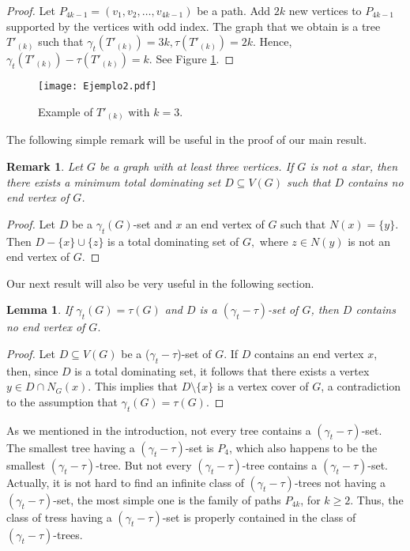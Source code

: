 \documentclass[12pt]{article}%
\newtheorem{lemma}[theorem]{Lemma}
\newtheorem{remark}[theorem]{Remark}
\theoremstyle{definition}
\newcommand{\gtt}{$(\gamma_t - \tau)$}
\begin{document}
\begin{proof} 
Let $P_{4k-1}=(v_1,v_2,\ldots,v_{4k-1})$ be a path. Add $2k$
new vertices to $P_{4k-1}$ supported by the vertices with odd
index. The graph that we obtain is a tree $T'_{(k)}$ such that
$\gamma_t(T'_{(k)})=3k, \tau(T'_{(k)})=2k$.   Hence, $\gamma_t
(T'_{(k)})-\tau(T'_{(k)})=k.$   See Figure \ref{fig2}.


\end{proof}

\begin{figure}[h]
\centering
  \texttt{[image: Ejemplo2.pdf]}
 \caption{Example of $T'_{(k)}$ with $k=3$.} \label{fig2}
\end{figure}

The following simple remark will be useful in the proof
of our main result.

\begin{remark}  \label{noleafs}
Let $G$ be a graph with at least three vertices.   If $G$ is not a
star, then there exists a minimum total dominating set $D
\subseteq V(G)$ such that $D$ contains no end vertex of $G$.
\end{remark}

\begin{proof}
Let $D$ be a $\gamma_t (G)$-set and $x$ an end vertex of $G$
such that $N(x)=\{y\}$. Then $D-\{x\}\cup \{z\}$ is a total
dominating set  of $G,$ where $z\in N(y)$ is not an end vertex
of $G$.
\end{proof}

Our next result will also be very useful in the following section.

\begin{lemma}\label{lemat1}
If $\gamma_t(G)=\tau(G)$ and $D$ is a \gtt-set of $G$,
then $D$ contains no end vertex of $G.$ 
\end{lemma}

\begin{proof} 
Let $D \subseteq V(G)$ be a ($\gamma_t - \tau$)-set  of $G$.
If $D$ contains an end vertex $x$, then, since $D$ is a total
dominating set, it follows that there exists a vertex $y \in D
\cap N_G (x)$.   This implies that $D \setminus \{ x \}$ is a
vertex cover of $G$, a contradiction to the assumption that
$\gamma_t (G) = \tau (G)$.
\end{proof}

As we mentioned in the introduction, not every tree contains
a \gtt-set.   The smallest tree having a \gtt-set is $P_4$, which
also happens to be the smallest \gtt-tree.   But not every
\gtt-tree contains a \gtt-set.   Actually, it is not hard to find an
infinite class of \gtt-trees not having a \gtt-set, the most simple
one is the family of paths $P_{4k}$, for $k \ge 2$.   Thus, the
class of tress having a \gtt-set is properly contained in the class
of \gtt-trees.
\end{document}
